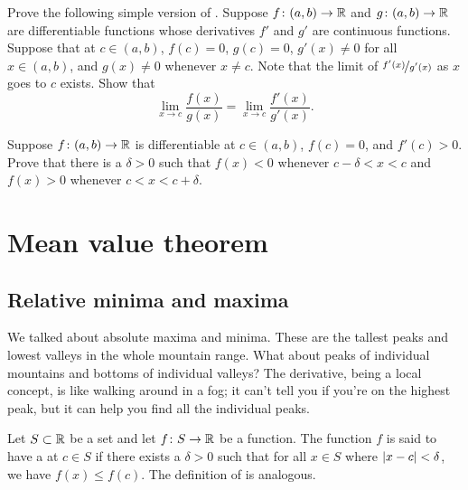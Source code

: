 \begin{exercise} \label{exercise:simpleLHopital}
Prove the following simple version of .
Suppose 
$f \colon (a,b) \to {\mathbb{R}}$ and $g \colon (a,b) \to {\mathbb{R}}$ are differentiable
functions
whose derivatives $f'$ and $g'$ are continuous functions.
Suppose that at $c \in (a,b)$, $f(c) = 0$, $g(c)=0$,
$g'(x) \not= 0$ for all $x \in (a,b)$, and
$g(x) \not= 0$ whenever $x \not= c$.   Note
that the limit of $\nicefrac{f'(x)}{g'(x)}$ as $x$ goes to $c$ exists.  Show that
\begin{equation*}
\lim_{x \to c} \frac{f(x)}{g(x)} = 
\lim_{x \to c} \frac{f'(x)}{g'(x)} .
\end{equation*}
\end{exercise}

\begin{exercise}
Suppose $f \colon (a,b) \to {\mathbb{R}}$ is differentiable at $c \in (a,b)$,
$f(c)=0$, and $f'(c) > 0$.
Prove that there is a $\delta > 0$ such that $f(x) < 0$
whenever $c-\delta < x < c$ and
$f(x) > 0$ 
whenever $c < x < c+\delta$.
\end{exercise}


\sectionnewpage
\section{Mean value theorem}
\label{sec:mvt}


\subsection{Relative minima and maxima}

We talked about absolute maxima and minima.  These are the tallest peaks and
lowest valleys in the whole mountain range.  What
about peaks of individual mountains and bottoms of individual valleys?
The derivative, being a local concept, is like walking around in a fog; it can't
tell you if you're on the highest peak, but it can help you find all the
individual peaks.

\begin{defn}
Let $S \subset {\mathbb{R}}$ be a set and
let $f \colon S \to {\mathbb{R}}$ be a function.  The function $f$ is said to have
a \emph{}
at $c \in S$ if there exists a $\delta>0$
such that for all $x \in S$ where $\left\lvert {x-c} \right\rvert < \delta$,
we have $f(x) \leq f(c)$.
The definition of
\emph{}
is analogous.
\end{defn}

